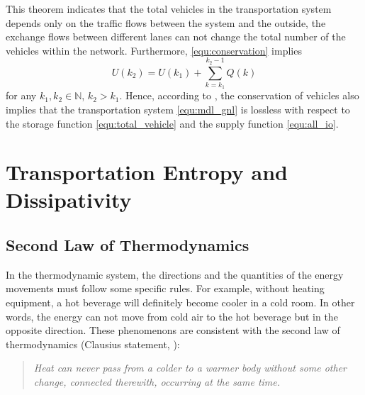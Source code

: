 \documentclass[preprint,authoryear,12pt]{elsarticle}
\begin{document}
This theorem indicates that the total vehicles in the transportation system depends only on the traffic flows between the system and the outside, the exchange flows between different lanes can not change the total number of the vehicles within the network. Furthermore, \eqref{equ:conservation} implies
\begin{equation}\label{equ:conservation_ex}
U(k_2) = U(k_1)+\sum_{k=k_1}^{k_2-1}Q(k)
\end{equation}
for any $k_1,k_2\in\mathbb{N}$, $k_2>k_1$. Hence, according to \citep{willems_dissipative_1972-1}, the conservation of vehicles also implies that the transportation system \eqref{equ:mdl_gnl} is lossless with respect to the storage function \eqref{equ:total_vehicle} and the supply function \eqref{equ:all_io}.

\section{Transportation Entropy and Dissipativity}\label{sec:entropy}

\subsection{Second Law of Thermodynamics}

In the thermodynamic system, the directions and the quantities of the energy movements must follow some specific rules. For example, without heating equipment, a hot beverage will definitely become cooler in a cold room. In other words, the energy can not move from cold air to the hot beverage but in the opposite direction. These phenomenons are consistent with the second law of thermodynamics (Clausius statement, \citet{clausius_mechanical_1867}):
\begin{quotation}
\it Heat can never pass from a colder to a warmer body without some other change, connected therewith, occurring at the same time.
\end{quotation}
\end{document}
